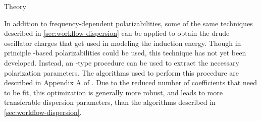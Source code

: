\begin{subsubsection}{Theory}

In addition to frequency-dependent polarizabilities, some of the same techniques
described in \cref{sec:workflow-dispersion} can be applied to obtain the
drude oscillator charges that get used in modeling the
induction energy. Though in principle \isa-based polarizabilities could be
used, this technique has not yet been developed. Instead, an \idma-type
procedure can be used to extract the necessary polarization parameters. The
algorithms used to perform this procedure are described in Appendix A of
. Due to the reduced number of coefficients that need to
be fit, this optimization is generally more robust, and leads to more
transferable dispersion parameters, than the algorithms described in
\cref{sec:workflow-dispersion}.

\end{subsubsection}
